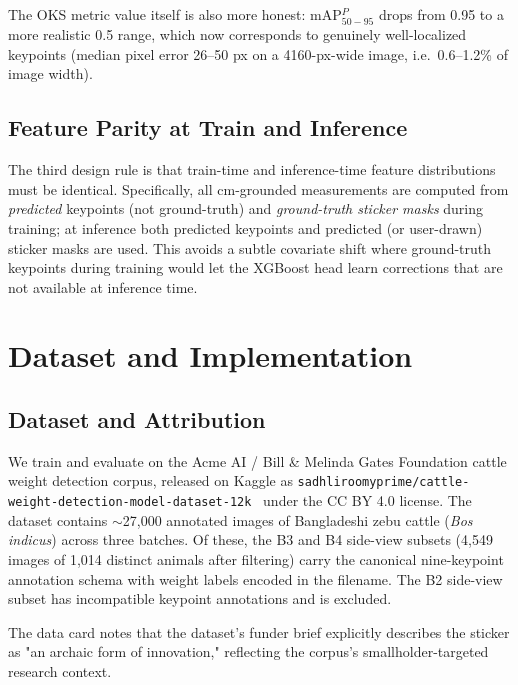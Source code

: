 \documentclass[conference]{IEEEtran}
\begin{document}
The OKS metric value itself is also more honest: mAP$_{50-95}^P$ drops from 0.95 to a more realistic 0.5 range, which now corresponds to genuinely well-localized keypoints (median pixel error 26--50 px on a 4160-px-wide image, i.e.\ 0.6--1.2\% of image width).

\subsection{Feature Parity at Train and Inference}

The third design rule is that train-time and inference-time feature distributions must be identical. Specifically, all cm-grounded measurements are computed from \textit{predicted} keypoints (not ground-truth) and \textit{ground-truth sticker masks} during training; at inference both predicted keypoints and predicted (or user-drawn) sticker masks are used. This avoids a subtle covariate shift where ground-truth keypoints during training would let the XGBoost head learn corrections that are not available at inference time.

\section{Dataset and Implementation}
\label{sec:impl}

\subsection{Dataset and Attribution}

We train and evaluate on the Acme AI / Bill \& Melinda Gates Foundation cattle weight detection corpus, released on Kaggle as \texttt{sadhliroomyprime/\allowbreak{}cattle-weight-detection-model-dataset-12k}~\cite{kaggle_acme_bmgf} under the CC BY 4.0 license. The dataset contains $\sim$27,000 annotated images of Bangladeshi zebu cattle (\textit{Bos indicus}) across three batches. Of these, the B3 and B4 side-view subsets (4,549 images of 1,014 distinct animals after filtering) carry the canonical nine-keypoint annotation schema with weight labels encoded in the filename. The B2 side-view subset has incompatible keypoint annotations and is excluded.

The data card notes that the dataset's funder brief explicitly describes the sticker as "an archaic form of innovation," reflecting the corpus's smallholder-targeted research context.
\end{document}
